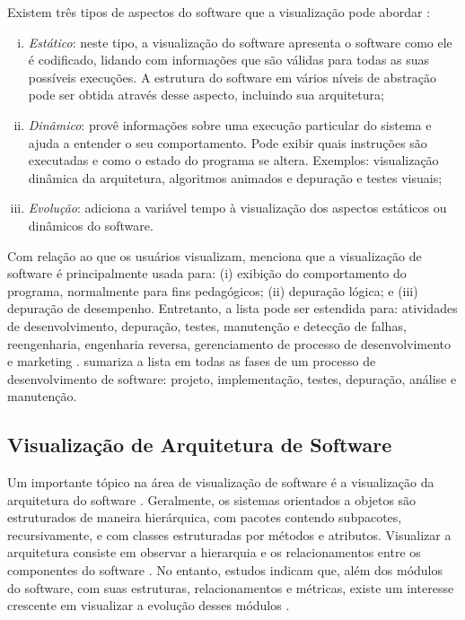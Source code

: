 Existem três tipos de aspectos do software que a visualização pode abordar \cite{Diehl2007}:
\begin{enumerate}[(i)]
	\item \textit{Estático}: neste tipo, a visualização do software apresenta o software como ele é codificado, lidando com informações que são válidas para todas as suas possíveis execuções. A estrutura do software em vários níveis de abstração pode ser obtida através desse aspecto, incluindo sua arquitetura;
	\item \textit{Dinâmico}: provê informações sobre uma execução particular do sistema e ajuda a entender o seu comportamento. Pode exibir quais instruções são executadas e como o estado do programa se altera. Exemplos: visualização dinâmica da arquitetura, algoritmos animados e depuração e testes visuais;
	\item \textit{Evolução}: adiciona a variável tempo à visualização dos aspectos estáticos ou dinâmicos do software.
\end{enumerate}

Com relação ao que os usuários visualizam, \citeauthor{Gomez-Henriquez2001a} menciona que a visualização de software é principalmente usada para: (i) exibição do comportamento do programa, normalmente para fins pedagógicos; (ii) depuração lógica; e (iii) depuração de desempenho. Entretanto, a lista pode ser estendida para: atividades de desenvolvimento, depuração, testes, manutenção e detecção de falhas, reengenharia, engenharia reversa, gerenciamento de processo de desenvolvimento e marketing \cite{Maletic2002}. \citeauthor{Diehl2007} sumariza a lista em todas as fases de um processo de desenvolvimento de software: projeto, implementação, testes, depuração, análise e manutenção.

\subsection{Visualização de Arquitetura de Software} \label{subsec:visualizacao-arquitetura-software}

Um importante tópico na área de visualização de software é a visualização da arquitetura do software \cite{Ghanam2008}\cite{Denford2002}\cite{Gallagher2005}\cite{Gallagher2008}. Geralmente, os sistemas orientados a objetos são estruturados de maneira hierárquica, com pacotes contendo subpacotes, recursivamente, e com classes estruturadas por métodos e atributos. Visualizar a arquitetura consiste em observar a hierarquia e os relacionamentos entre os componentes do software \cite{Caserta2011}. No entanto, estudos indicam que, além dos módulos do software, com suas estruturas, relacionamentos e métricas, existe um interesse crescente em visualizar a evolução desses módulos \cite{Ambros2007}.

